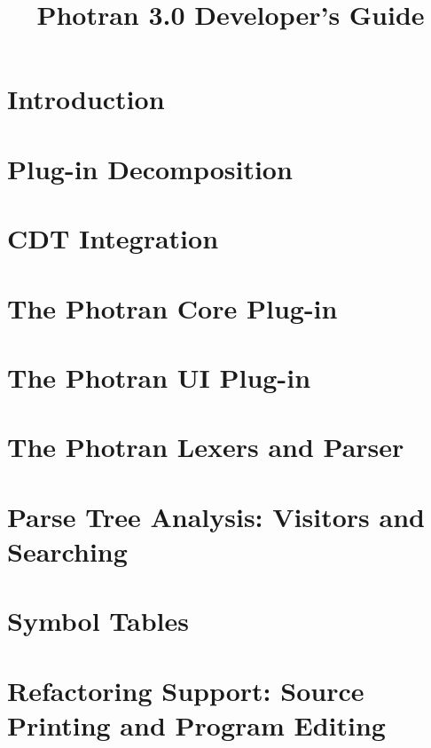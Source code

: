\documentclass[10pt,letterpaper]{report}
\begin{document}
\title{Photran 3.0 Developer's Guide}
\author{

}
\date{}

\maketitle

\tableofcontents


\chapter{Introduction}


\chapter{Plug-in Decomposition}


\chapter{CDT Integration}


\chapter{The Photran Core Plug-in}


\chapter{The Photran UI Plug-in}


\chapter{The Photran Lexers and Parser}


\chapter{Parse Tree Analysis: Visitors and Searching}


\chapter{Symbol Tables}


\chapter{Refactoring Support: Source Printing and Program Editing}

\end{document}
